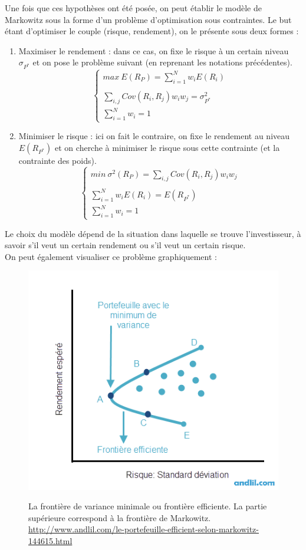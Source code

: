 Une fois que ces hypothèses ont été posée, on peut établir le modèle de Markowitz sous la forme d'un problème d'optimisation sous contraintes. Le but étant d'optimiser le couple (risque, rendement), on le présente sous deux formes :
\begin{enumerate}
 \item Maximiser le rendement : dans ce cas, on fixe le risque à un certain niveau $\sigma_{P^*}$ et on pose le problème suivant (en reprenant les notations précédentes).
  \[  \left\{
	\begin{array}{l}
	   max\ E(R_P) = \sum_{i=1}^N w_i E(R_i) \\\\
	   \sum_{i,j} Cov(R_i,R_j) w_i w_j = \sigma_{P^*}^2 \\
	   \sum_{i=1}^{N}w_i =1
	\end{array}
    \right.
  \]

 \item Minimiser le risque : ici on fait le contraire, on fixe le rendement au niveau $E(R_{P^*})$ et on cherche à minimiser le risque sous cette contrainte (et la contrainte des poids).
  \[  \left\{
	\begin{array}{l}
	   min\ \sigma^2(R_P) = \sum_{i,j} Cov(R_i,R_j) w_i w_j \\\\
	   \sum_{i=1}^N w_i E(R_i) = E(R_{P^*}) \\
	   \sum_{i=1}^{N}w_i =1
	\end{array}
    \right.
  \]
\end{enumerate}
Le choix du modèle dépend de la situation dans laquelle se trouve l'investisseur, à savoir s'il veut un certain rendement ou s'il veut un certain risque.\\

On peut également visualiser ce problème graphiquement :
\begin{figure}[H]
    \center
    \includegraphics[scale=0.4]{../graph/frontiereEfficiente.png} \\
    \caption{La frontière de variance minimale ou frontière efficiente. La partie supérieure correspond à la frontière de Markowitz. \url{http://www.andlil.com/le-portefeuille-efficient-selon-markowitz-144615.html}}
\end{figure}

